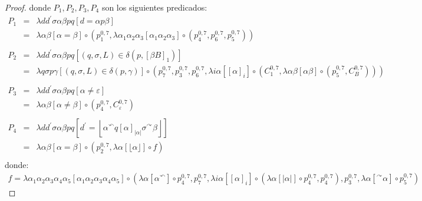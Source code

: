 \begin{proof}
    \PN donde $P_1, P_2,  P_3, P_4$ son los siguientes predicados:
    \begin{eqnarray*}
      P_1 &=& \lambda dd^{\prime}\sigma\alpha\beta pq \left[d = \alpha p \beta\right] \\
          &=& \lambda \alpha\beta\left[\alpha = \beta\right]
                \circ (
                  p_{1}^{0,7},
                  \lambda \alpha_1\alpha_2\alpha_3\left[\alpha_1\alpha_2\alpha_3\right]
                    \circ (
                      p_{4}^{0,7},
                      p_{6}^{0,7},
                      p_{5}^{0,7})) \\
      \\
      P_2 &=& \lambda dd^{\prime}\sigma\alpha\beta pq \left[(q,\sigma,L) \in \delta \left(p,\left[\beta B\right]_{1}
        \right)\right] \\
          &=& \lambda q\sigma p\gamma \left[(q,\sigma,L) \in \delta (p,\gamma)\right]
                \circ (
                  p_{7}^{0,7},
                  p_{3}^{0,7},
                  p_{6}^{0,7},
                  \lambda i\alpha \left[\left[\alpha\right]_i\right]
                  \circ (
                    C_{1}^{0,7},
                    \lambda \alpha \beta \left[ \alpha\beta \right] \circ (p_{5}^{0,7}, C_{B}^{0,7}))) \\
      \\
      P_3 &=& \lambda d d^{\prime}\sigma\alpha\beta p q \left[ \alpha \neq \varepsilon \right] \\
          &=& \lambda \alpha\beta \left[\alpha \neq \beta\right]
              \circ (
                p_{4}^{0,7},
                C_{\varepsilon}^{0,7}) \\
      \\
      P_4 &=& \lambda dd^{\prime}\sigma\alpha\beta pq \left[d^{\prime} = \left\lfloor \alpha^{\curvearrowleft}q
        \left[\alpha\right]_{\lvert \alpha \rvert } \sigma^{\curvearrowright} \beta \right\rfloor\right] \\
          &=& \lambda \alpha\beta\left[ \alpha=\beta \right]
                \circ (
                  p_{2}^{0,7},
                  \lambda \alpha \left[ \lfloor \alpha \rfloor \right] \circ f) \\
    \end{eqnarray*}
    \PN donde:
    \begin{align*}
      f =  \lambda\alpha_1\alpha_2\alpha_3\alpha_4\alpha_5 \left[ \alpha_1\alpha_2\alpha_3\alpha_4\alpha_5 \right]
            \circ (
              \lambda \alpha \left[ \alpha ^{\curvearrowleft } \right] \circ p_{4}^{0,7},
              p_{7}^{0,7},
              \lambda i\alpha \left[ \left[\alpha\right]_i \right]
                \circ (
                  \lambda \alpha \left[\lvert\alpha\rvert \right] \circ p_{4}^{0,7},
                  p_{4}^{0,7}
              ),
              p_{3}^{0,7},
              \lambda \alpha \left[ ^{\curvearrowright}\alpha \right] \circ p_{5}^{0,7}
            )
    \end{align*}


\end{proof}
